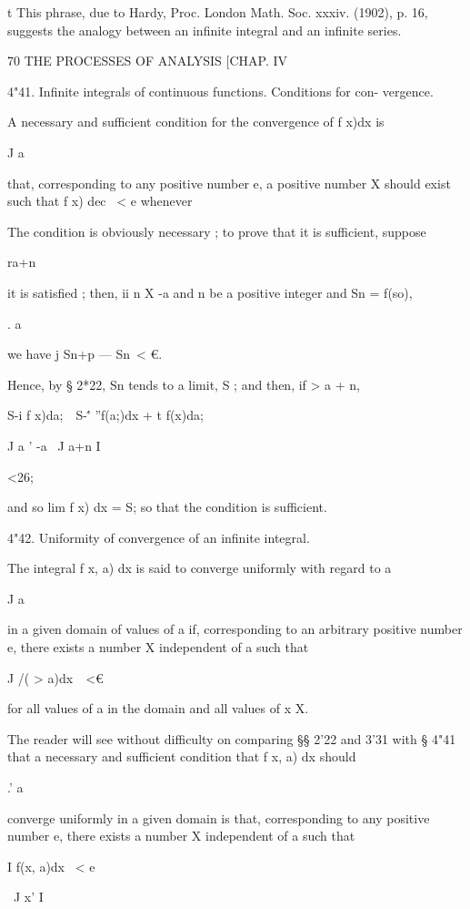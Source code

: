 t This phrase, due to Hardy, Proc. London Math. Soc. xxxiv. (1902), p.
16, suggests the analogy between an infinite integral and an infinite
series.



70 THE PROCESSES OF ANALYSIS [CHAP. IV

4"41. Infinite integrals of continuous functions. Conditions for con-
vergence.

A necessary and sufficient condition for the convergence of f x)dx is

J a

that, corresponding to any positive number e, a positive number X
should exist such that f x) dec \ < e whenever

The condition is obviously necessary ; to prove that it is sufficient,
suppose

ra+n

it is satisfied ; then, ii n X -a and n be a positive integer and Sn =
f(so),

. a

we have j Sn+p — Sn\ < €.

Hence, by § 2*22, Sn tends to a limit, S ; and then, if > a + n,

S-i f x)da;\ \ S-\'' ''f(a;)dx + t f(x)da;\

J a ' -a \ J a+n I

<26;

and so lim f x) dx = S; so that the condition is sufficient.

4"42. Uniformity of convergence of an infinite integral.

The integral f x, a) dx is said to converge uniformly with regard to a

J a

in a given domain of values of a if, corresponding to an arbitrary
positive number e, there exists a number X independent of a such that

J /( > a)dx\ \ <€

for all values of a in the domain and all values of x X.

The reader will see without difficulty on comparing §§ 2'22 and 3'31
with § 4"41 that a necessary and sufficient condition that f x, a) dx
should

.' a

converge uniformly in a given domain is that, corresponding to any
positive number e, there exists a number X independent of a such that

I f(x, a)dx \ < e

\ J x' I

